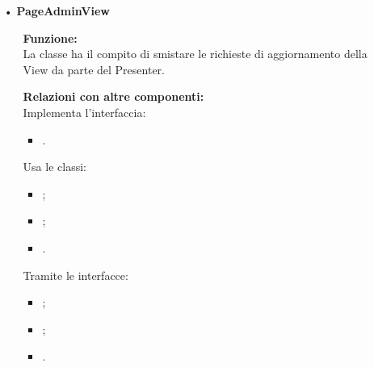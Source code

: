 {\begin{sloppypar}
{\begin{itemize}
\begin{itemize}
					\texttt{+ void errorViewFilter(String error);}\\
					Notifica la presenza di errori nella chiave usata come filtro.\\
					
					\texttt{+ void setUserList(Vector<String> listaUtenti);}\\
					Imposta la lista degli utenti.\\
					
					\texttt{+ void setUsernameLabel(String username);}\\
					Invia il nome utente alla GUI\g~ di visualizzazione delle statistiche.\\
			\end{itemize}
		
		\item[•] \textbf{PageAdminView}
			\begin{itemize}
				\item[]  \textbf{Funzione:} \\
				La classe ha il compito di smistare le richieste di aggiornamento della View da parte del Presenter.
				
				\item[]  \textbf{Relazioni con altre componenti:} \\
				Implementa l'interfaccia:
				\begin{itemize}
					\item {}.
				\end{itemize}
				Usa le classi:
				\begin{itemize}
					\item {};
					\item {};
					\item {}.
				\end{itemize}
				Tramite le interfacce:
				\begin{itemize}
					\item {};
					\item {};
					\item {}.
				\end{itemize}
					

\end{itemize}
\end{itemize}}
\end{sloppypar}}

